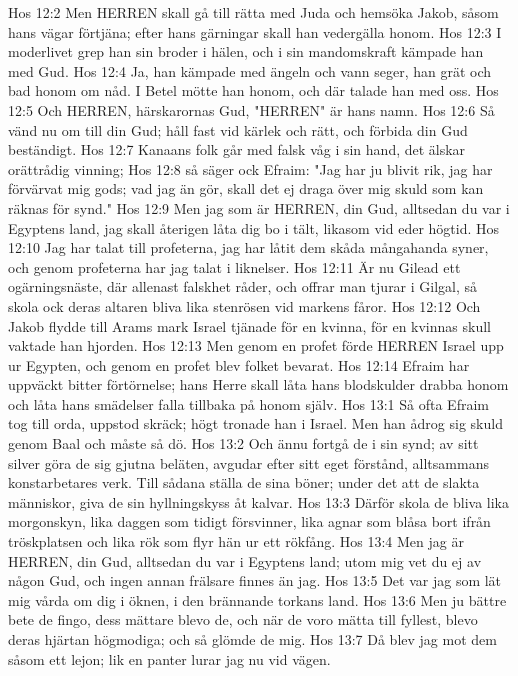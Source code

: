 Hos 12:2  Men HERREN skall gå till rätta med Juda och hemsöka Jakob, såsom hans vägar förtjäna; efter hans gärningar skall han vedergälla honom.
Hos 12:3  I moderlivet grep han sin broder i hälen, och i sin mandomskraft kämpade han med Gud.
Hos 12:4  Ja, han kämpade med ängeln och vann seger, han grät och bad honom om nåd. I Betel mötte han honom, och där talade han med oss.
Hos 12:5  Och HERREN, härskarornas Gud, "HERREN" är hans namn.
Hos 12:6  Så vänd nu om till din Gud; håll fast vid kärlek och rätt, och förbida din Gud beständigt.
Hos 12:7  Kanaans folk går med falsk våg i sin hand, det älskar orättrådig vinning;
Hos 12:8  så säger ock Efraim: "Jag har ju blivit rik, jag har förvärvat mig gods; vad jag än gör, skall det ej draga över mig skuld som kan räknas för synd."
Hos 12:9  Men jag som är HERREN, din Gud, alltsedan du var i Egyptens land, jag skall återigen låta dig bo i tält, likasom vid eder högtid.
Hos 12:10  Jag har talat till profeterna, jag har låtit dem skåda mångahanda syner, och genom profeterna har jag talat i liknelser.
Hos 12:11  Är nu Gilead ett ogärningsnäste, där allenast falskhet råder, och offrar man tjurar i Gilgal, så skola ock deras altaren bliva lika stenrösen vid markens fåror.
Hos 12:12  Och Jakob flydde till Arams mark Israel tjänade för en kvinna, för en kvinnas skull vaktade han hjorden.
Hos 12:13  Men genom en profet förde HERREN Israel upp ur Egypten, och genom en profet blev folket bevarat.
Hos 12:14  Efraim har uppväckt bitter förtörnelse; hans Herre skall låta hans blodskulder drabba honom och låta hans smädelser falla tillbaka på honom själv.
Hos 13:1  Så ofta Efraim tog till orda, uppstod skräck; högt tronade han i Israel. Men han ådrog sig skuld genom Baal och måste så dö.
Hos 13:2  Och ännu fortgå de i sin synd; av sitt silver göra de sig gjutna beläten, avgudar efter sitt eget förstånd, alltsammans konstarbetares verk. Till sådana ställa de sina böner; under det att de slakta människor, giva de sin hyllningskyss åt kalvar.
Hos 13:3  Därför skola de bliva lika morgonskyn, lika daggen som tidigt försvinner, lika agnar som blåsa bort ifrån tröskplatsen och lika rök som flyr hän ur ett rökfång.
Hos 13:4  Men jag är HERREN, din Gud, alltsedan du var i Egyptens land; utom mig vet du ej av någon Gud, och ingen annan frälsare finnes än jag.
Hos 13:5  Det var jag som lät mig vårda om dig i öknen, i den brännande torkans land.
Hos 13:6  Men ju bättre bete de fingo, dess mättare blevo de, och när de voro mätta till fyllest, blevo deras hjärtan högmodiga; och så glömde de mig.
Hos 13:7  Då blev jag mot dem såsom ett lejon; lik en panter lurar jag nu vid vägen.
